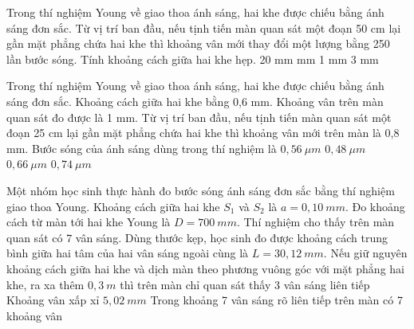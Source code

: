 \begin{ex}%
Trong thí nghiệm Young về giao thoa ánh sáng, hai khe được chiếu bằng ánh sáng đơn sắc. Từ vị trí ban đầu, nếu tịnh tiến màn quan sát một đoạn 50 cm lại gần mặt phẳng chứa hai khe thì khoảng vân mới thay đổi một lượng bằng 250 lần bước sóng. Tính khoảng cách giữa hai khe hẹp.
\choice
{20 mm}
{ mm}
{1 mm}
{3 mm}

\end{ex} 
\begin{ex}%
Trong thí nghiệm Young về giao thoa ánh sáng, hai khe được chiếu bằng ánh sáng đơn sắc. Khoảng cách giữa hai khe bằng 0,6 mm. Khoảng vân trên màn quan sát đo được là 1 mm. Từ vị trí ban đầu, nếu tịnh tiến màn quan sát một đoạn 25 cm lại gần mặt phẳng chứa hai khe thì khoảng vân mới trên màn là 0,8 mm. Bước sóng của ánh sáng dùng trong thí nghiệm là
\choice
{$0,56\ \mu m$}
{\True $0,48\ \mu m$}
{$0,66\ \mu m$}
{$0,74\ \mu m$}
\end{ex} 
\setcounter{ex}{0}
\PhanII
\begin{ex}
Một nhóm học sinh thực hành đo bước sóng ánh sáng đơn sắc bằng thí nghiệm giao thoa Young. Khoảng cách giữa hai khe $S_1$ và $S_2$ là $a=0,10\ mm$. Đo khoảng cách từ màn tới hai khe Young là $D=700\ mm$. Thí nghiệm cho thấy trên màn quan sát có $7$ vân sáng. Dùng thước kẹp, học sinh đo được khoảng cách trung bình giữa hai tâm của hai vân sáng ngoài cùng là $L=30,12\ mm$.
{Nếu giữ nguyên khoảng cách giữa hai khe và dịch màn theo phương vuông góc với mặt phẳng hai khe, ra xa thêm $0,3\ m$ thì trên màn chỉ quan sát thấy 3 vân sáng liên tiếp}
{\True Khoảng vân xấp xỉ $5,02\ mm$}
{Trong khoảng 7 vân sáng rõ liên tiếp trên màn có 7 khoảng vân}
\loigiai{
\begin{itemchoice}
\itemch 
\itemch 
\itemch 
\itemch 
\end{itemchoice}
}
\end{ex}
